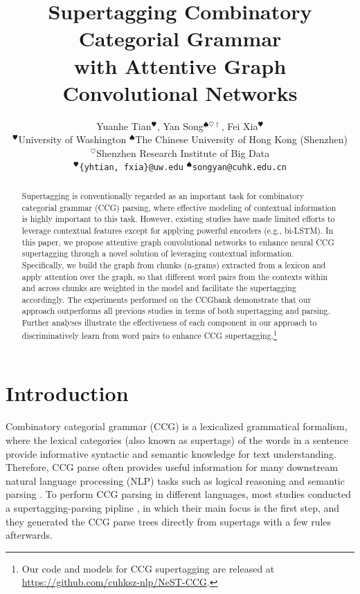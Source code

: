 \documentclass[11pt,a4paper]{article}
\title{Supertagging Combinatory Categorial Grammar\\with Attentive Graph Convolutional Networks}
\author{
    Yuanhe Tian$^{\varheart}$, \hspace{0.2cm}
    Yan Song$^{{\spadesuit}\heartsuit\dag}$, \hspace{0.2cm}
    Fei Xia$^{\varheart}$\\
$^{\varheart}$University of Washington \hspace{0.4cm}
$^{\spadesuit}$The Chinese University of Hong Kong (Shenzhen)\\
    $^{\heartsuit}$Shenzhen Research Institute of Big Data \\
$^{\varheart}$\texttt{\{yhtian, fxia\}@uw.edu} \hspace{0.4cm}
    $^{\spadesuit}$\texttt{songyan@cuhk.edu.cn} \\ \hspace{0.4cm}
}
\date{}
\begin{document}
\maketitle

\renewcommand{\thefootnote}{\fnsymbol{footnote}}

\renewcommand{\thefootnote}{\arabic{footnote}}


\begin{abstract}

Supertagging is conventionally regarded as an important task for combinatory categorial grammar (CCG) parsing, where effective modeling of contextual information is highly important to this task.
However, existing studies have made limited efforts to leverage contextual features except for applying powerful encoders (e.g., bi-LSTM).
In this paper, we propose attentive graph convolutional networks to enhance neural CCG supertagging through a novel solution of leveraging contextual information.
Specifically, we build the graph from chunks (n-grams) extracted from a lexicon and apply attention over the graph, so that different 
word pairs
from the contexts within and across chunks are weighted in the model and facilitate the supertagging accordingly.
The experiments performed on the CCGbank demonstrate that our approach outperforms all previous studies
in terms of both supertagging and parsing.
Further analyses illustrate the effectiveness of each component in our approach to discriminatively learn from word pairs to enhance CCG supertagging.\footnote{Our code and models for CCG supertagging are released at \url{https://github.com/cuhksz-nlp/NeST-CCG}.}

\end{abstract}


\section{Introduction} \label{intro}







Combinatory categorial grammar (CCG) is a lexicalized grammatical formalism, where the lexical categories (also known as supertags) of the words in a sentence provide informative syntactic and semantic knowledge for text understanding.
Therefore, CCG parse often provides useful information for many downstream natural language processing (NLP) tasks such as logical reasoning \cite{yoshikawa-etal-2018-consistent} and semantic parsing \cite{beschke-2019-exploring}.
To perform CCG parsing in different languages,
most studies conducted a supertagging-parsing pipline \cite{clark-curran-2007-wide,kummerfeld-etal-2010-faster,song2012construction,lewis-steedman-2014-improved,huang2015chinese, xu-etal-2015-ccg, lewis-etal-2016-lstm, vaswani-etal-2016-supertagging, yoshikawa-etal-2017-ccg}, in which their main focus is the first step, and they generated the CCG parse trees directly from supertags with a few rules afterwards.
\end{document}
